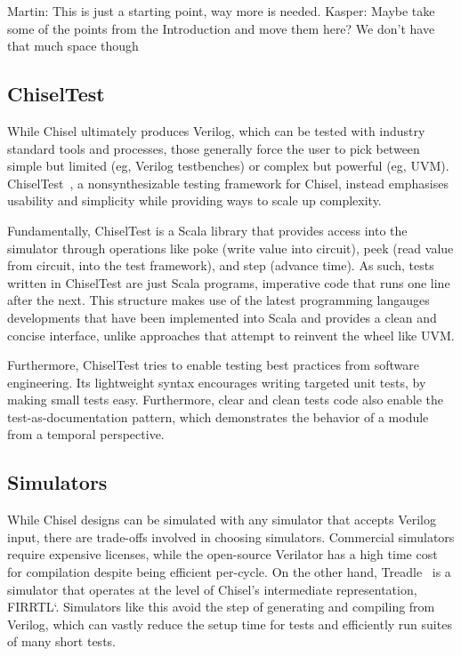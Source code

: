 \documentclass[conference]{IEEEtran}
\newcommand{\martin}[1]{{\color{blue} Martin: #1}}
\newcommand{\kasper}[1]{{\color{purple} Kasper: #1}}
\begin{document}
\martin{This is just a starting point, way more is needed.}
\kasper{Maybe take some of the points from the Introduction and move them here? We don't have that much space though}

\subsection{ChiselTest}

While Chisel ultimately produces Verilog, which can be tested with industry standard tools and processes, those generally force the user to pick between simple but limited (eg, Verilog testbenches) or complex but powerful (eg, UVM).\\
ChiselTest~\cite{chisel:tester2}, a nonsynthesizable testing framework for Chisel, instead emphasises usability and simplicity while providing ways to scale up complexity.

Fundamentally, ChiselTest is a Scala library that provides access into the simulator through operations like poke (write value into circuit), peek (read value from circuit, into the test framework), and step (advance time).
As such, tests written in ChiselTest are just Scala programs, imperative code that runs one line after the next.
This structure makes use of the latest programming langauges developments that have been implemented into Scala and provides a clean and concise interface, unlike approaches that attempt to reinvent the wheel like UVM.

Furthermore, ChiselTest tries to enable testing best practices from software engineering.
Its lightweight syntax encourages writing targeted unit tests, by making small tests easy.
Furthermore, clear and clean tests code also enable the test-as-documentation pattern, which demonstrates the behavior of a module from a temporal perspective.


\subsection{Simulators}

While Chisel designs can be simulated with any simulator that accepts Verilog input, there are trade-offs involved in choosing simulators.
Commercial simulators require expensive licenses, while the open-source Verilator has a high time cost for compilation despite being efficient per-cycle.
On the other hand, Treadle~\cite{treadle} is a simulator that operates at the level of Chisel's intermediate representation, FIRRTL`\cite{firrtl}.
Simulators like this avoid the step of generating and compiling from Verilog, which can vastly reduce the setup time for tests and efficiently run suites of many short tests.
\end{document}
